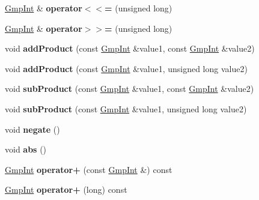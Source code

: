 \begin{DoxyCompactItemize}
\item 
\mbox{\label{class_gmp_int_a843bdf4262c4a51a69f6a2b657c1f358}} 
\hyperlink{class_gmp_int}{Gmp\+Int} \& {\bfseries operator$<$$<$=} (unsigned long)
\item 
\mbox{\label{class_gmp_int_af675d23e4631edb9f6bb69840b017af8}} 
\hyperlink{class_gmp_int}{Gmp\+Int} \& {\bfseries operator$>$$>$=} (unsigned long)
\item 
\mbox{\label{class_gmp_int_a6108a1ed85c367f5ab1307be5c02ca75}} 
void {\bfseries add\+Product} (const \hyperlink{class_gmp_int}{Gmp\+Int} \&value1, const \hyperlink{class_gmp_int}{Gmp\+Int} \&value2)
\item 
\mbox{\label{class_gmp_int_a23d67865bf1d149f868ebf946153dac9}} 
void {\bfseries add\+Product} (const \hyperlink{class_gmp_int}{Gmp\+Int} \&value1, unsigned long value2)
\item 
\mbox{\label{class_gmp_int_af56e440b21bd5c6bb2980ddda47ba96d}} 
void {\bfseries sub\+Product} (const \hyperlink{class_gmp_int}{Gmp\+Int} \&value1, const \hyperlink{class_gmp_int}{Gmp\+Int} \&value2)
\item 
\mbox{\label{class_gmp_int_a9ac672feed3c35e1278a124270a75f3b}} 
void {\bfseries sub\+Product} (const \hyperlink{class_gmp_int}{Gmp\+Int} \&value1, unsigned long value2)
\item 
\mbox{\label{class_gmp_int_a84208f21b851945f4ab715ba90d10a76}} 
void {\bfseries negate} ()
\item 
\mbox{\label{class_gmp_int_a817a35ae687775915c608f246d4c3a0f}} 
void {\bfseries abs} ()
\item 
\mbox{\label{class_gmp_int_ad315055f4f3491a97b1d64dd70329cc6}} 
\hyperlink{class_gmp_int}{Gmp\+Int} {\bfseries operator+} (const \hyperlink{class_gmp_int}{Gmp\+Int} \&) const
\item 
\mbox{\label{class_gmp_int_afe459c1963cc8a9d3f8100fc331e4da5}} 
\hyperlink{class_gmp_int}{Gmp\+Int} {\bfseries operator+} (long) const
\item 

\end{DoxyCompactItemize}
